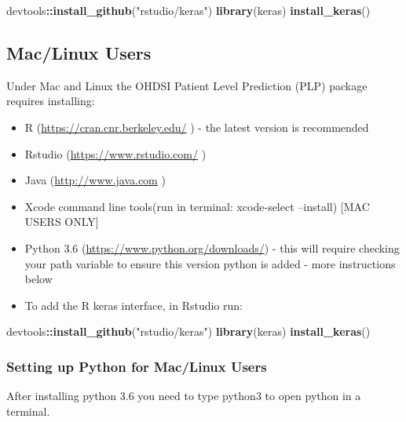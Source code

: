 \documentclass[]{article}
\newenvironment{Shaded}{\begin{snugshade}}{\end{snugshade}}
\newcommand{\KeywordTok}[1]{\textcolor[rgb]{0.13,0.29,0.53}{\textbf{#1}}}
\newcommand{\StringTok}[1]{\textcolor[rgb]{0.31,0.60,0.02}{#1}}
\newcommand{\OperatorTok}[1]{\textcolor[rgb]{0.81,0.36,0.00}{\textbf{#1}}}
\newcommand{\NormalTok}[1]{#1}
\providecommand{\tightlist}{%
  \setlength{\itemsep}{0pt}\setlength{\parskip}{0pt}}
\begin{document}
\begin{Shaded}
\begin{Highlighting}[]
\NormalTok{devtools}\OperatorTok{::}\KeywordTok{install_github}\NormalTok{(}\StringTok{"rstudio/keras"}\NormalTok{)}
\KeywordTok{library}\NormalTok{(keras)}
\KeywordTok{install_keras}\NormalTok{()}
\end{Highlighting}
\end{Shaded}

\subsection{Mac/Linux Users}\label{maclinux-users}

Under Mac and Linux the OHDSI Patient Level Prediction (PLP) package
requires installing:

\begin{itemize}
\tightlist
\item
  R (\url{https://cran.cnr.berkeley.edu/} ) - the latest version is
  recommended
\item
  Rstudio (\url{https://www.rstudio.com/} )
\item
  Java (\url{http://www.java.com} )
\item
  Xcode command line tools(run in terminal: xcode-select --install)
  {[}MAC USERS ONLY{]}
\item
  Python 3.6 (\url{https://www.python.org/downloads/}) - this will
  require checking your path variable to ensure this version python is
  added - more instructions below
\item
  To add the R keras interface, in Rstudio run:
\end{itemize}

\begin{Shaded}
\begin{Highlighting}[]
\NormalTok{devtools}\OperatorTok{::}\KeywordTok{install_github}\NormalTok{(}\StringTok{"rstudio/keras"}\NormalTok{)}
\KeywordTok{library}\NormalTok{(keras)}
\KeywordTok{install_keras}\NormalTok{()}
\end{Highlighting}
\end{Shaded}

\subsubsection{Setting up Python for Mac/Linux
Users}\label{setting-up-python-for-maclinux-users}

After installing python 3.6 you need to type python3 to open python in a
terminal.
\end{document}
